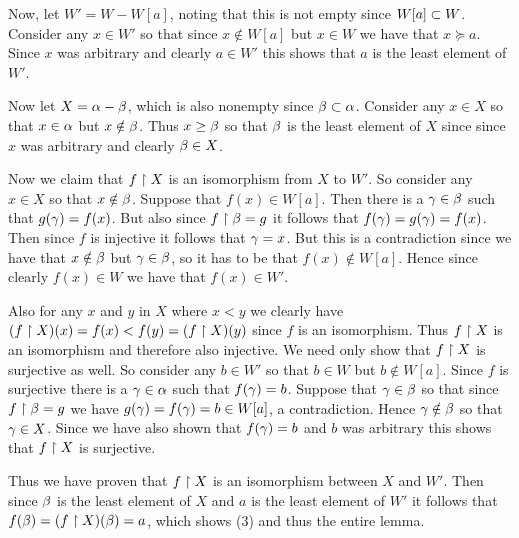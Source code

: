 \begin{questions}
{{    Now, let $W' = W - W[a]$, noting that this is not empty since $W[a] \subset W$.
    Consider any $x \in W'$ so that since $x \notin W[a]$ but $x \in W$ we have that $x \succeq a$.
    Since $x$ was arbitrary and clearly $a \in W'$ this shows that $a$ is the least element of $W'$.

    Now let $X = \alpha - \beta$, which is also nonempty since $\beta \subset \alpha$.
    Consider any $x \in X$ so that $x \in \alpha$ but $x \notin \beta$.
    Thus $x \geq \beta$ so that $\beta$ is the least element of $X$ since since $x$ was arbitrary and clearly $\beta \in X$.

    Now we claim that $f \restriction X$ is an isomorphism from $X$ to $W'$.
    So consider any $x \in X$ so that $x \notin \beta$.
    Suppose that $f(x) \in W[a]$.
    Then there is a $\gamma \in \beta$ such that $g(\gamma) = f(x)$.
    But also since $f \restriction \beta = g$ it follows that $f(\gamma) = g(\gamma) = f(x)$.
    Then since $f$ is injective it follows that $\gamma = x$.
    But this is a contradiction since we have that $x \notin \beta$ but $\gamma \in \beta$, so it has to be that $f(x) \notin W[a]$.
    Hence since clearly $f(x) \in W$ we have that $f(x) \in W'$.

    Also for any $x$ and $y$ in $X$ where $x < y$ we clearly have $(f \restriction X)(x) = f(x) < f(y) = (f \restriction X)(y)$ since $f$ is an isomorphism.
    Thus $f \restriction X$ is an isomorphism and therefore also injective.
    We need only show that $f \restriction X$ is surjective as well.
    So consider any $b \in W'$ so that $b \in W$ but $b \notin W[a]$.
    Since $f$ is surjective there is a $\gamma \in \alpha$ such that $f(\gamma) = b$.
    Suppose that $\gamma \in \beta$ so that since $f \restriction \beta = g$ we have $g(\gamma) = f(\gamma) = b \in W[a]$, a contradiction.
    Hence $\gamma \notin \beta$ so that $\gamma \in X$.
    Since we have also shown that $f(\gamma) = b$ and $b$ was arbitrary this shows that $f \restriction X$ is surjective.

    Thus we have proven that $f \restriction X$ is an isomorphism between $X$ and $W'$.
    Then since $\beta$ is the least element of $X$ and $a$ is the least element of $W'$ it follows that $f(\beta) = (f \restriction X)(\beta) = a$, which shows (3) and thus the entire lemma.
  }

  \mainthrm
  }
\end{questions}
